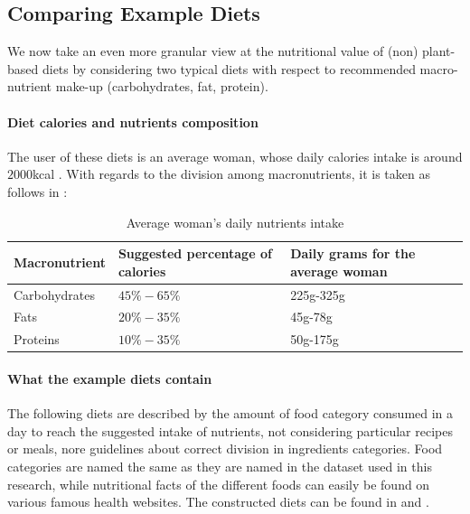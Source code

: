 \documentclass{article}
\begin{document}
\subsection{Comparing Example Diets}
We now take an even more granular view at the nutritional value of (non) plant-based diets by considering two typical diets with respect to recommended macro-nutrient make-up (carbohydrates, fat, protein).

\paragraph*{Diet calories and nutrients composition}
The user of these diets is an average woman, whose daily calories intake is around $2000$kcal \cite{NHS}. With regards to the division among macronutrients, it is taken as follows in  \cite{Healthline}:

\begin{table}
  \caption{Average woman's daily nutrients intake}
  \label{tbl:composition}
  \centering
  \begin{tabular}{lll}
    \toprule
    Macronutrient     & Suggested percentage of calories   & Daily grams for the average woman  \\
    \midrule
    Carbohydrates & $45\%-65\%$ &  225g-325g  \\
    Fats    & $20\%-35\% $  & 45g-78g \\
    Proteins & $10\%-35\%$ & 50g-175g \\
    \bottomrule
  \end{tabular}
\end{table}

\paragraph*{What the example diets contain}
The following diets are described by the amount of food category consumed in a day to reach the suggested intake of nutrients, not considering particular recipes or meals, nore guidelines about correct division in ingredients categories. Food categories are named the same as they are named in the dataset used in this research, while nutritional facts of the different foods can easily be found on various famous health websites. The constructed diets can be found in  and .
\end{document}
